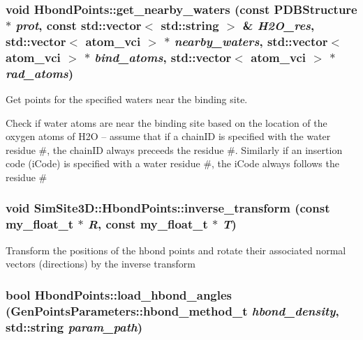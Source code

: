 \subsubsection{\setlength{\rightskip}{0pt plus 5cm}void Hbond\-Points::get\_\-nearby\_\-waters (const \bf{PDBStructure} $\ast$ {\em prot}, const std::vector$<$ std::string $>$ \& {\em H2O\_\-res}, std::vector$<$ atom\_\-vci $>$ $\ast$ {\em nearby\_\-waters}, std::vector$<$ atom\_\-vci $>$ $\ast$ {\em bind\_\-atoms}, std::vector$<$ atom\_\-vci $>$ $\ast$ {\em rad\_\-atoms})\hspace{0.3cm}{\tt  [private]}}\label{classSimSite3D_1_1HbondPoints_ff5ef9470438e55c45d421cafde76651}


Get points for the specified waters near the binding site. 

Check if water atoms are near the binding site based on the location of the oxygen atoms of H2O -- assume that if a chain\-ID is specified with the water residue \#, the chain\-ID always preceeds the residue \#. Similarly if an insertion code (i\-Code) is specified with a water residue \#, the i\-Code always follows the residue \# 
\subsubsection{\setlength{\rightskip}{0pt plus 5cm}void SimSite3D::Hbond\-Points::inverse\_\-transform (const my\_\-float\_\-t $\ast$ {\em R}, const my\_\-float\_\-t $\ast$ {\em T})\hspace{0.3cm}{\tt  [inline]}}\label{classSimSite3D_1_1HbondPoints_f9c02371e09065fb1099aa0a0921b4c4}


Transform the positions of the hbond points and rotate their associated normal vectors (directions) by the inverse transform 
\subsubsection{\setlength{\rightskip}{0pt plus 5cm}bool Hbond\-Points::load\_\-hbond\_\-angles (\bf{Gen\-Points\-Parameters::hbond\_\-method\_\-t} {\em hbond\_\-density}, std::string {\em param\_\-path})\hspace{0.3cm}{\tt  [private]}}\label{classSimSite3D_1_1HbondPoints_9c96fe73b65271a49aebf9e4f17fc787}


